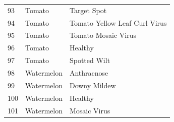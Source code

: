 \begin{longtable}{@{}C{1.6cm} L{4.2cm} L{8.1cm}@{}}
93 & Tomato & Target Spot \\
94 & Tomato & Tomato Yellow Leaf Curl Virus \\
95 & Tomato & Tomato Mosaic Virus \\
96 & Tomato & Healthy \\
97 & Tomato & Spotted Wilt \\
98 & Watermelon & Anthracnose \\
99 & Watermelon & Downy Mildew \\
100 & Watermelon & Healthy \\
101 & Watermelon & Mosaic Virus \\
\end{longtable}
